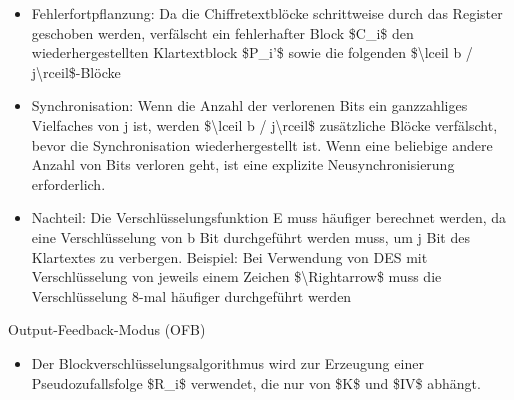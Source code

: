\documentclass[a4paper]{article}
\begin{document}
\begin{multicols}{3}
\begin{itemize}
              \begin{itemize}
                  \item
                        Fehlerfortpflanzung: Da die Chiffretextblöcke schrittweise durch das
                        Register geschoben werden, verfälscht ein fehlerhafter Block
                        \$C\_i\$ den wiederhergestellten Klartextblock \$P\_i'\$ sowie die
                        folgenden \$\textbackslash lceil b / j\textbackslash rceil\$-Blöcke
                  \item
                        Synchronisation: Wenn die Anzahl der verlorenen Bits ein
                        ganzzahliges Vielfaches von j ist, werden \$\textbackslash lceil b /
                        j\textbackslash rceil\$ zusätzliche Blöcke verfälscht, bevor die
                        Synchronisation wiederhergestellt ist. Wenn eine beliebige andere
                        Anzahl von Bits verloren geht, ist eine explizite
                        Neusynchronisierung erforderlich.
                  \item
                        Nachteil: Die Verschlüsselungsfunktion E muss häufiger berechnet
                        werden, da eine Verschlüsselung von b Bit durchgeführt werden muss,
                        um j Bit des Klartextes zu verbergen. Beispiel: Bei Verwendung von
                        DES mit Verschlüsselung von jeweils einem Zeichen
                        \$\textbackslash Rightarrow\$ muss die Verschlüsselung 8-mal
                        häufiger durchgeführt werden
              \end{itemize}
    \end{itemize}

    Output-Feedback-Modus (OFB)

    \begin{itemize}
        \item
              Der Blockverschlüsselungsalgorithmus wird zur Erzeugung einer
              Pseudozufallsfolge \$R\_i\$ verwendet, die nur von \$K\$ und \$IV\$
              abhängt.


\end{itemize}
\end{multicols}
\end{document}
